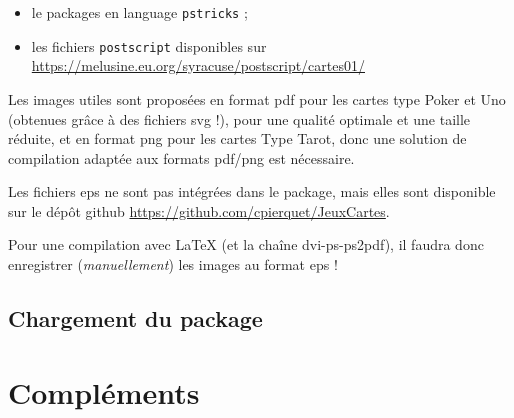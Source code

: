 \documentclass{article}
\newcommand\ctex[1]{\tcbox[vignettelatex]{#1}}
\begin{document}
{{{{{{{\begin{codeinfo}
\begin{itemize}
	\item le packages \ctex{pst-poker} en language \texttt{pstricks} ;
	\item les fichiers \texttt{postscript} disponibles sur \url{https://melusine.eu.org/syracuse/postscript/cartes01/}
\end{itemize}
\end{codeinfo}

\begin{codeattention}
Les images utiles sont proposées en format \textsf{pdf} pour les cartes type \textsf{Poker} et \textsf{Uno} (obtenues grâce à des fichiers \textsf{svg} !), pour une qualité optimale et une taille réduite, et en format \textsf{png} pour les cartes Type \textsf{Tarot}, donc une solution de compilation adaptée aux formats \textsf{pdf/png} est nécessaire.

\smallskip

Les fichiers \textsf{eps} ne sont pas intégrées dans le package, mais elles sont disponible sur le dépôt \textsf{github} \url{https://github.com/cpierquet/JeuxCartes}.

\smallskip

Pour une compilation avec \LaTeX{} (et la chaîne \textsf{dvi-ps-ps2pdf}), il faudra donc enregistrer (\textit{manuellement}) les images au format \textsf{eps} !
\end{codeattention}

\subsection{Chargement du package}



\section{Compléments}

}}}}}}}
\end{document}
